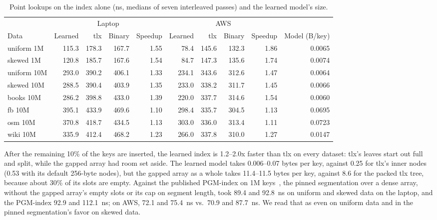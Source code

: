\documentclass[conference]{IEEEtran}
\begin{document}
\begin{table}[t]
\caption{Point lookups on the index alone (ns, medians of seven
interleaved passes) and the learned model's size.}
\label{tab:index}
\centering
\small
\begin{tabular}{lrrrrrrrrr}
\toprule
& \multicolumn{4}{c}{Laptop} & \multicolumn{4}{c}{AWS} & \\
Data & Learned & tlx & Binary & Speedup & Learned & tlx & Binary & Speedup & Model (B/key) \\
\midrule
uniform 1M & 115.3 & 178.3 & 167.7 & 1.55 & 78.4 & 145.6 & 132.3 & 1.86 & 0.0065 \\
skewed 1M & 120.8 & 185.7 & 167.6 & 1.54 & 84.7 & 147.3 & 135.6 & 1.74 & 0.0074 \\
uniform 10M & 293.0 & 390.2 & 406.1 & 1.33 & 234.1 & 343.6 & 312.6 & 1.47 & 0.0064 \\
skewed 10M & 288.5 & 390.4 & 403.9 & 1.35 & 233.0 & 338.2 & 311.7 & 1.45 & 0.0066 \\
books 10M & 286.2 & 398.8 & 433.0 & 1.39 & 220.0 & 337.7 & 314.6 & 1.54 & 0.0060 \\
fb 10M & 395.1 & 433.9 & 469.6 & 1.10 & 298.4 & 335.7 & 304.5 & 1.13 & 0.0695 \\
osm 10M & 370.8 & 418.7 & 434.5 & 1.13 & 303.0 & 336.0 & 313.4 & 1.11 & 0.0723 \\
wiki 10M & 335.9 & 412.4 & 468.2 & 1.23 & 266.0 & 337.8 & 310.0 & 1.27 & 0.0147 \\
\bottomrule
\end{tabular}
\end{table}

After the remaining 10\% of the keys are inserted, the learned index is
1.2--2.0x faster than tlx on every dataset: tlx's leaves start out full
and split, while the gapped array had room set aside. The learned model
takes 0.006--0.07 bytes per key, against 0.25 for tlx's inner nodes (0.53
with its default 256-byte nodes), but the gapped array as a whole takes
11.4--11.5 bytes per key, against 8.6 for the packed tlx tree, because about
30\% of its slots are empty. Against the published PGM-index on 1M
keys~\cite{ferragina2020}, the pinned segmentation over a dense array, without
the gapped array's empty slots or its cap on segment length, took 89.4 and
92.8~ns on uniform and skewed data on the laptop, and the PGM-index 92.9 and
112.1~ns; on AWS, 72.1 and 75.4~ns vs.\ 70.9 and 87.7~ns. We read that as
even on uniform data and in the pinned segmentation's favor on skewed data.
\end{document}
